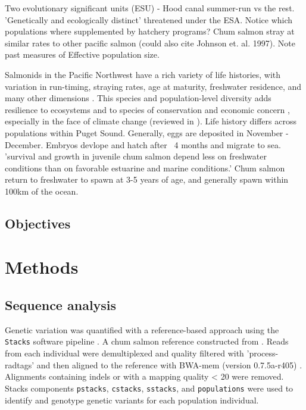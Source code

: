 \documentclass[12pt, one column]{article}
\begin{document}
Two evolutionary significant units (ESU) - Hood canal summer-run vs the rest. 'Genetically and ecologically distinct' threatened under the ESA. Notice which populations where supplemented by hatchery programs?
Chum salmon stray at similar rates to other pacific salmon \cite{Small2014} (could also cite Johnson et. al. 1997).  Note past measures of Effective population size.

Salmonids in the Pacific Northwest have a rich variety of life histories, with variation in run-timing, straying rates, age at maturity, freshwater residence, and many other dimensions \citep{Quinn2005}. This species and population-level diversity adds resilience to ecosystems and to species of conservation and economic concern \citep{Schindler2010}, especially in the face of climate change (reviewed in \citet{Schindler2015}).  Life history differs across populations within Puget Sound.  Generally, eggs are deposited in November - December. Embryos devlope and hatch after ~4 months and migrate to sea. 'survival and growth in juvenile chum salmon depend less on freshwater conditions than on favorable estuarine and marine conditions.'  Chum salmon return to freshwater to spawn at 3-5 years of age, and generally spawn within 100km of the ocean.

\subsection*{Objectives}

\section*{Methods}

\subsection*{Sequence analysis}
Genetic variation was quantified with a reference-based approach using the \texttt{Stacks} software pipeline \citep{Catchen2013}.  A chum salmon reference constructed from \citep{Waples2015}. Reads from each individual were demultiplexed and quality filtered with 'process-radtags' and then aligned to the reference with BWA-mem  (version 0.7.5a-r405) \citep{Li2013}.  Alignments containing indels or with a mapping quality < 20 were removed. Stacks components \texttt{pstacks}, \texttt{cstacks}, \texttt{sstacks}, and \texttt{populations} were used to identify and genotype genetic variants for each population individual.
\end{document}
